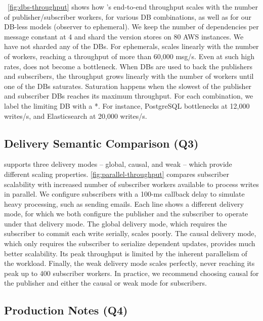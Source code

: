 \F~\ref{fig:dbs-throughput} shows how \synapse's end-to-end throughput scales
with the number of publisher/subscriber workers, for various DB
combinations, as well as for our
DB-less models (observer to ephemeral). We keep the number of dependencies per
message constant at 4 and shard the version stores on 80 AWS instances.
We have not sharded any of the DBs.
For ephemerals, \synapse scales linearly with the number of
workers, reaching a throughput of more than 60,000 msg/s. Even at such high
rates, \synapse does not become a bottleneck.  When DBs are used to
back the publishers and subscribers, the throughput grows linearly with the
number of workers until one of the DBs saturates. Saturation happens when the
slowest of the publisher and subscriber DBs reaches its maximum throughput. For each combination, we label the limiting DB with a *. For
instance, PostgreSQL bottlenecks at 12,000 writes/s, and Elasticsearch at
20,000 writes/s.


\subsection{Delivery Semantic Comparison (Q3)}
\label{sec:evaluation:delivery}

\synapse supports three delivery modes -- global, causal, and weak -- which
provide different scaling properties.
\F\ref{fig:parallel-throughput} compares subscriber scalability with 
increased number of subscriber workers available to process writes in parallel.
We configure subscribers with a 100-ms callback delay to simulate
heavy processing, such as sending emails.
Each line shows a different delivery mode, for which we both configure the
publisher and the subscriber to operate under that delivery mode.
The global delivery mode, which requires the
subscriber to commit each write serially, scales poorly.  The causal
delivery mode, which only requires the subscriber to serialize dependent
updates, provides much better scalability.  Its peak throughput is limited by
the inherent parallelism of the workload.  Finally, the weak delivery mode
scales perfectly, never reaching its peak up to 400 subscriber workers.
In practice, we recommend choosing causal for the publisher and either the
causal or weak mode for subscribers.

\subsection{Production Notes (Q4)}
\label{sec:eval:ease-of-use}

